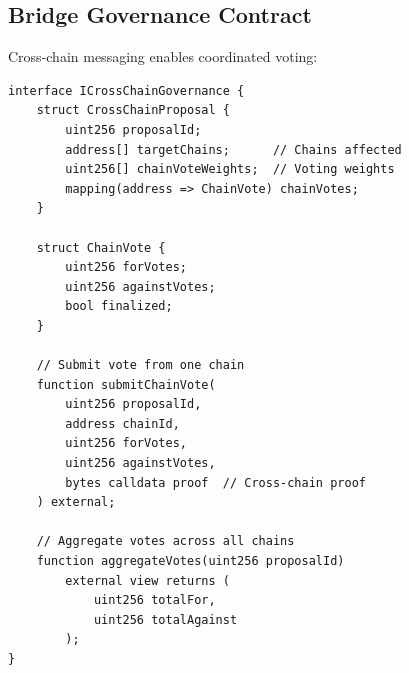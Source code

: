 \subsection{Bridge Governance Contract}

Cross-chain messaging enables coordinated voting:

\begin{lstlisting}[language=Solidity,caption=Cross-chain governance bridge]
interface ICrossChainGovernance {
    struct CrossChainProposal {
        uint256 proposalId;
        address[] targetChains;      // Chains affected
        uint256[] chainVoteWeights;  // Voting weights
        mapping(address => ChainVote) chainVotes;
    }

    struct ChainVote {
        uint256 forVotes;
        uint256 againstVotes;
        bool finalized;
    }

    // Submit vote from one chain
    function submitChainVote(
        uint256 proposalId,
        address chainId,
        uint256 forVotes,
        uint256 againstVotes,
        bytes calldata proof  // Cross-chain proof
    ) external;

    // Aggregate votes across all chains
    function aggregateVotes(uint256 proposalId)
        external view returns (
            uint256 totalFor,
            uint256 totalAgainst
        );
}
\end{lstlisting}

